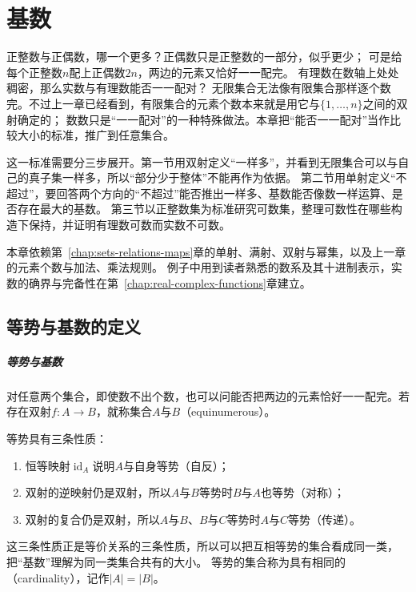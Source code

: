 \chapter{基数}
\label{chap:cardinality}

正整数与正偶数，哪一个更多？正偶数只是正整数的一部分，似乎更少；
可是给每个正整数$n$配上正偶数$2n$，两边的元素又恰好一一配完。
有理数在数轴上处处稠密，那么实数与有理数能否一一配对？
无限集合无法像有限集合那样逐个数完。不过上一章已经看到，有限集合的元素个数本来就是用它与$\{1,\ldots,n\}$之间的双射确定的；
数数只是“一一配对”的一种特殊做法。本章把“能否一一配对”当作比较大小的标准，推广到任意集合。

这一标准需要分三步展开。第一节用双射定义“一样多”，并看到无限集合可以与自己的真子集一样多，所以“部分少于整体”不能再作为依据。
第二节用单射定义“不超过”，要回答两个方向的“不超过”能否推出一样多、基数能否像数一样运算、是否存在最大的基数。
第三节以正整数集为标准研究可数集，整理可数性在哪些构造下保持，并证明有理数可数而实数不可数。

本章依赖第~\ref{chap:sets-relations-maps}章的单射、满射、双射与幂集，以及上一章的元素个数与加法、乘法规则。
例子中用到读者熟悉的数系及其十进制表示，实数的确界与完备性在第~\ref{chap:real-complex-functions}章建立。

\section{等势与基数的定义}
\label{sec:comb-cardinality}
\label{sec:comb-equinumerosity-cardinality}

\paragraph{等势与基数}
对任意两个集合，即使数不出个数，也可以问能否把两边的元素恰好一一配完。若存在双射$f:A\to B$，就称集合$A$与$B$（equinumerous）。

等势具有三条性质：
\begin{enumerate}
\item 恒等映射$\operatorname{id}_A$说明$A$与自身等势（自反）；
\item 双射的逆映射仍是双射，所以$A$与$B$等势时$B$与$A$也等势（对称）；
\item 双射的复合仍是双射，所以$A$与$B$、$B$与$C$等势时$A$与$C$等势（传递）。
\end{enumerate}

这三条性质正是等价关系的三条性质，所以可以把互相等势的集合看成同一类，把“基数”理解为同一类集合共有的大小。
等势的集合称为具有相同的（cardinality），记作$|A|=|B|$。

